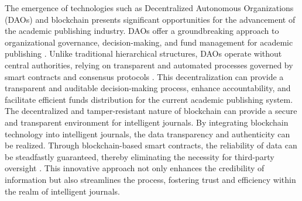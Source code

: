 \documentclass[lettersize,journal]{IEEEtran}
\begin{document}
The emergence of technologies such as Decentralized Autonomous Organizations (DAOs) \cite{buterin2014next} and blockchain \cite{swan2015blockchain,9093840} presents significant opportunities for the advancement of the academic publishing industry. DAOs offer a groundbreaking approach to organizational governance, decision-making, and fund management for academic publishing \cite{wang2019decentralized}. Unlike traditional hierarchical structures, DAOs operate without central authorities, relying on transparent and automated processes governed by smart contracts and consensus protocols \cite{kaal2021decentralized}. This decentralization can provide a transparent and auditable decision-making process, enhance accountability, and facilitate efficient funds distribution for the current academic publishing system. The decentralized and tamper-resistant nature of blockchain can provide a secure and transparent environment for intelligent journals. By integrating blockchain technology into intelligent journals, the data transparency and authenticity can be realized. Through blockchain-based smart contracts, the reliability of data can be steadfastly guaranteed, thereby eliminating the necessity for third-party oversight \cite{mougayar2016business}. This innovative approach not only enhances the credibility of information but also streamlines the process, fostering trust and efficiency within the realm of intelligent journals.
\end{document}
